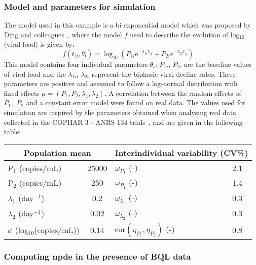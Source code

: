 \subsubsection{Model and parameters for simulation}

\hskip 18pt The model used in this example is a bi-exponential model which was proposed by Ding and colleagues~\cite{Ding1999}, where the model $f$ used to describe the evolution of log$_{10}$(viral load) is given by:
\begin{equation}
f(t_{ij},\theta_{i})=\log_{10}(P_{1i}\mbox{e}^{-\lambda_{1i}t_{ij}}+P_{2i}\mbox{e}^{-\lambda_{2i}t_{ij}})
\end{equation}
This model contains four individual parameters $\theta_{i}$: $P_{1i}$, $P_{2i}$ are the baseline values of viral load and the $\lambda_{1i}$, $\lambda_{2i}$ represent the biphasic viral decline rates. These parameters are positive and assumed to follow a log-normal distribution with fixed effects $\mu=(P_{1},P_{2},\lambda_{1},\lambda_{2})$. A correlation between the random effects of $P_{1},$ $P_{2}$ and a constant error model were found on real data. The values used for simulation are inspired by the parameters obtained when analysing real data collected in the COPHAR 3 - ANRS 134 trials~\cite{GoujardISA2010}, and are given in the following table:

\begin{center}
\begin{tabular} {l c | l c}
\hline 
\multicolumn{2}{c}{Population mean} & \multicolumn{2}{c}{Interindividual variability (CV\%)} \\
\hline 
P$_1$ (copies/mL) & 25000 & $\omega_{P_1}$ (-) & 2.1 \\
P$_2$ (copies/mL) & 250 & $\omega_{P_1}$ (-) & 1.4 \\
$\lambda_1$ (day$^{-1}$) & 0.2 & $\omega_{\lambda_1}$ (-) & 0.3 \\
$\lambda_2$ (day$^{-1}$) & 0.02 & $\omega_{\lambda_2}$ (-) & 0.3 \\
$\sigma $ (log$_{10}$(copies/mL)) & 0.14 & cor$(\eta_{P_1},\eta_{P_2})$ (-) & 0.8 \\
\hline
\end{tabular}
\end{center}

\subsubsection{Computing npde in the presence of BQL data}

